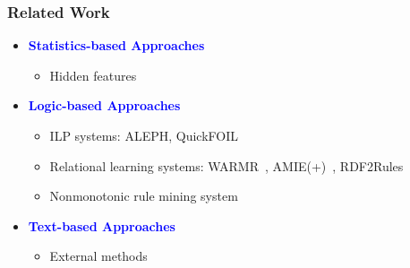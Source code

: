 \documentclass{beamer}
\newcommand{\naf}{{\it not}\,}
\newcommand{\bl}[1]{\textcolor{blue}{#1}}
\newcommand{\gr}[1]{\textcolor{darkgreen}{#1}}
\def\cG{\ensuremath{\mathcal{G}}}
\def\cR{\ensuremath{\mathcal{R}}}
\newcommand{\mi}[1]{\ensuremath{\mathit{#1}}}
\begin{document}
%
%
%
%
\begin{frame}\frametitle{Related Work}
\begin{itemize}
\item \textbf{\bl{Statistics-based Approaches}}
\begin{itemize}
\item Hidden features~\cite{rescal}
\end{itemize}
\medskip
\bigskip

\item \textbf{\bl{Logic-based Approaches}}
\begin{itemize}
\item ILP systems: ALEPH, QuickFOIL~\cite{quickfoil}
\item Relational learning systems: WARMR~\cite{warmr}, AMIE(+)~\cite{amie}, RDF2Rules~\cite{rdf2rules}
\item Nonmonotonic rule mining system~\cite{iswc2016}
\end{itemize}
\medskip
\bigskip

\item \textbf{\bl{Text-based Approaches}}
\begin{itemize}
\item External methods~\cite{match}
\end{itemize}
\medskip

\end{itemize}
\end{frame}


\end{document}
